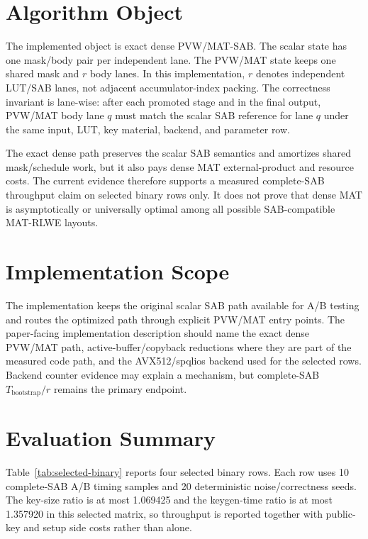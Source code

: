 \documentclass{article}
\begin{document}

\section{Algorithm Object}
The implemented object is exact dense PVW/MAT-SAB. The scalar state has one
mask/body pair per independent lane. The PVW/MAT state keeps one shared mask
and $r$ body lanes. In this implementation, $r$ denotes independent LUT/SAB
lanes, not adjacent accumulator-index packing. The correctness invariant is
lane-wise: after each promoted stage and in the final output, PVW/MAT body lane
$q$ must match the scalar SAB reference for lane $q$ under the same input, LUT,
key material, backend, and parameter row.

The exact dense path preserves the scalar SAB semantics and amortizes shared
mask/schedule work, but it also pays dense MAT external-product and resource
costs. The current evidence therefore supports a measured complete-SAB
throughput claim on selected binary rows only. It does not prove that dense MAT
is asymptotically or universally optimal among all possible SAB-compatible
MAT-RLWE layouts.

\section{Implementation Scope}
The implementation keeps the original scalar SAB path available for A/B testing
and routes the optimized path through explicit PVW/MAT entry points. The
paper-facing implementation description should name the exact dense PVW/MAT
path, active-buffer/copyback reductions where they are part of the measured
code path, and the AVX512/spqlios backend used for the selected rows. Backend
counter evidence may explain a mechanism, but complete-SAB $T_{\mathrm{bootstrap}}/r$
remains the primary endpoint.



\section{Evaluation Summary}
Table~\ref{tab:selected-binary} reports four selected binary rows. Each row
uses 10 complete-SAB A/B timing samples and 20 deterministic noise/correctness
seeds. The key-size ratio is at most 1.069425 and the keygen-time ratio is
at most 1.357920 in this selected matrix, so throughput is reported
together with public-key and setup side costs rather than alone.
\end{document}
